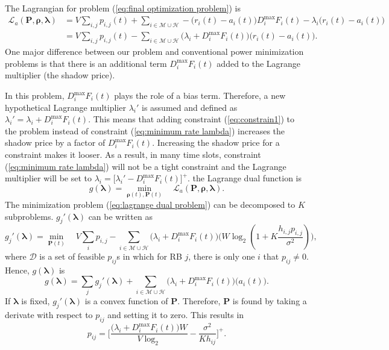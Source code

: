 \documentclass[journal,draftclsnofoot,onecolumn,12pt]{IEEEtran}%
\newcommand{\rhob}{\boldsymbol{\rho}}
\newcommand{\Pb}{\boldsymbol{P}}
\newcommand{\lambdab}{\boldsymbol{\lambda}}
\begin{document}
The Lagrangian for problem (\ref{eq:final optimization problem}) is
\begin{align}
\mathcal{L}_a(\boldsymbol{P}, \mathbf{\rho},\lambdab)&=V\sum_{i,j}p_{i,j}(t)+\sum_{i\in \mathcal{M} \cup \mathcal{H}} -\big(r_i(t)-a_i(t)\big)D_i^{\max}F_i(t)-\lambda_i\big(r_i(t)-a_i(t)\big)\nonumber\\
&=V\sum_{i,j}p_{i,j}(t)-\sum_{i\in \mathcal{M} \cup \mathcal{H}} \big(\lambda_i+D_i^{\max}F_i(t)\big) \big(r_i(t)-a_i(t)\big).\label{eq:lagrangian}
\end{align}
One major difference between our problem and conventional power minimization problems is that there is an additional term  $D_i^{\max} F_i(t)$ added to the Lagrange multiplier (the shadow price).
 
In this problem, $D_i^{\max} F_i(t)$ plays the role of a bias term. Therefore, a new hypothetical Lagrange multiplier $\lambda_i'$ is assumed and defined as
$
\lambda_i'=\lambda_i+D_i^{\max}F_i(t).
$
This means that adding  constraint (\ref{eq:constrain1}) to the problem instead of constraint (\ref{eq:minimum rate lambda}) increases the shadow price by a factor of $D_i^{\max}F_i(t)$. Increasing the shadow price for a constraint makes it looser. As a result, in many time slots,  constraint (\ref{eq:minimum rate lambda}) will not be a tight constraint and  the Lagrange multiplier will be set to  $\lambda_i=\big[\lambda_i'-D_i^{\max}F_i(t)\big]^+$. 
the Lagrange dual function is
\begin{equation}\label{eq:lagrange dual problem}
g(\lambdab)=\min_{\rhob(t),\Pb(t)} \quad \mathcal{L}_a(\boldsymbol{P}, \boldsymbol{\rho},\lambdab).
\end{equation}
The minimization problem (\ref{eq:lagrange dual problem}) can be decomposed to $K$ subproblems. $g_j'(\lambdab)$ can be written as
\begin{equation}
g_j'(\lambdab)=\min_{\Pb(t)} \quad V\sum_i p_{i,j}-\sum_{i\in \mathcal{M} \cup \mathcal{H}} \big(\lambda_i+D_i^{\max}F_i(t)\big) \big(W \log_2(1+K \frac{h_{i,j}p_{i,j}}{\sigma^2})\big),
\end{equation}
where $\mathcal{D}$ is a set of feasible $p_{ij}$s in which for RB $j$, there is only one $i$ that $p_{ij}\neq0$. Hence, $g(\lambdab)$ is
\begin{equation}\label{eq:dual_objective}
g(\lambdab)=\sum_j g_j'(\lambdab)+\sum_{i\in \mathcal{M} \cup \mathcal{H}} \big(\lambda_i+D_i^{\max}F_i(t)\big) \big(a_i(t)\big).
\end{equation}
If $\lambdab$ is fixed, $g_j'(\lambdab)$ is a convex function of $\boldsymbol{P}$. Therefore,  $\boldsymbol{P}$ is found by taking a derivate with respect to $p_{ij}$ and setting it to zero. This results in 
\begin{equation}\label{eq:pijfind}
p_{ij}=\Big[\frac{\big(\lambda_i+D_i^{\max}F_i(t)\big) W}{V \log_2 }-\frac{\sigma^2}{K h_{ij}}\Big]^+.
\end{equation}
\end{document}
